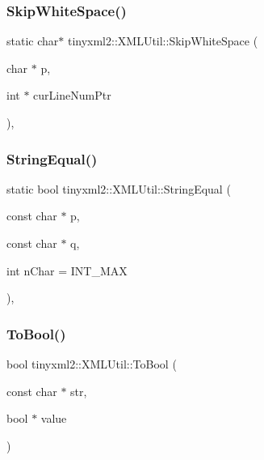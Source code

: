 \subsubsection{\texorpdfstring{Skip\+White\+Space()}{SkipWhiteSpace()}\hspace{0.1cm}{\footnotesize\ttfamily [2/2]}}
{\footnotesize\ttfamily static char$\ast$ tinyxml2\+::\+X\+M\+L\+Util\+::\+Skip\+White\+Space (\begin{DoxyParamCaption}\item[{char $\ast$}]{p,  }\item[{int $\ast$}]{cur\+Line\+Num\+Ptr }\end{DoxyParamCaption})\hspace{0.3cm}{\ttfamily [inline]}, {\ttfamily [static]}}

\mbox{\label{classtinyxml2_1_1_x_m_l_util_acfcd287cacfd2533e1bc9ea4dfb56602}} 
\subsubsection{\texorpdfstring{String\+Equal()}{StringEqual()}}
{\footnotesize\ttfamily static bool tinyxml2\+::\+X\+M\+L\+Util\+::\+String\+Equal (\begin{DoxyParamCaption}\item[{const char $\ast$}]{p,  }\item[{const char $\ast$}]{q,  }\item[{int}]{n\+Char = {\ttfamily INT\+\_\+MAX} }\end{DoxyParamCaption})\hspace{0.3cm}{\ttfamily [inline]}, {\ttfamily [static]}}

\mbox{\label{classtinyxml2_1_1_x_m_l_util_ae5b03e0a1ca5d42052a7ac540f7aa12a}} 
\subsubsection{\texorpdfstring{To\+Bool()}{ToBool()}}
{\footnotesize\ttfamily bool tinyxml2\+::\+X\+M\+L\+Util\+::\+To\+Bool (\begin{DoxyParamCaption}\item[{const char $\ast$}]{str,  }\item[{bool $\ast$}]{value }\end{DoxyParamCaption})\hspace{0.3cm}{\ttfamily [static]}}

